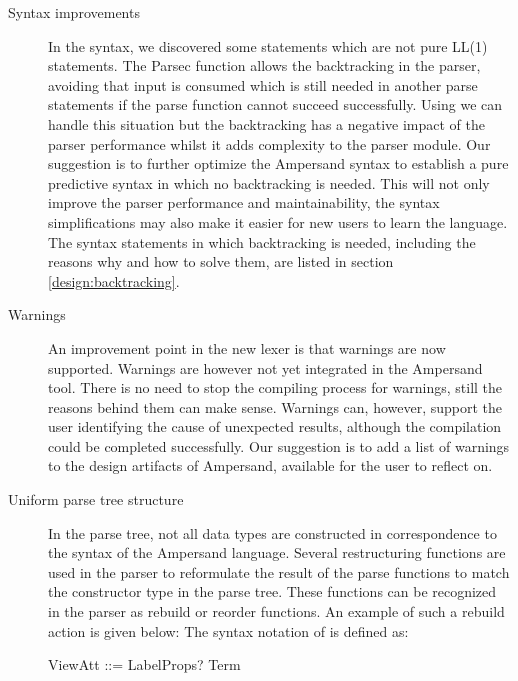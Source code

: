 \begin{description}
  \item[Syntax improvements]
    In the syntax, we discovered some statements which are not pure LL(1) statements.
    The Parsec  function allows the backtracking in the parser, avoiding that input is consumed which is still needed in another parse statements if the parse function cannot succeed successfully.
    Using  we can handle this situation but the backtracking has a negative impact of the parser performance whilst it adds complexity to the parser module.
    Our suggestion is to further optimize the Ampersand syntax to establish a pure predictive syntax in which no backtracking is needed.
    This will not only improve the parser performance and maintainability, the syntax simplifications may also make it easier for new users to learn the language.
    The syntax statements in which backtracking is needed, including the reasons why and how to solve them, are listed in section \ref{design:backtracking}.

  \item[Warnings]
    An improvement point in the new lexer is that warnings are now supported. 
    Warnings are however not yet integrated in the Ampersand tool.
    There is no need to stop the compiling process for warnings, still the reasons behind them can make sense.
    Warnings can, however, support the user identifying the cause of unexpected results, although the compilation could be completed successfully.
    Our suggestion is to add a list of warnings to the design artifacts of Ampersand, available for the user to reflect on.
  \item[Uniform parse tree structure]
   In the parse tree, not all data types are constructed in correspondence to the syntax of the Ampersand language.
   Several restructuring functions are used in the parser to reformulate the result of the parse functions to match the constructor type in the parse tree.
   These functions can be recognized in the parser as rebuild or reorder functions.
   An example of such a rebuild action is given below:
   The syntax notation of  is defined as:
   \begin{ebnf}
    ViewAtt ::= LabelProps? Term\end{ebnf}
   

\end{description}
